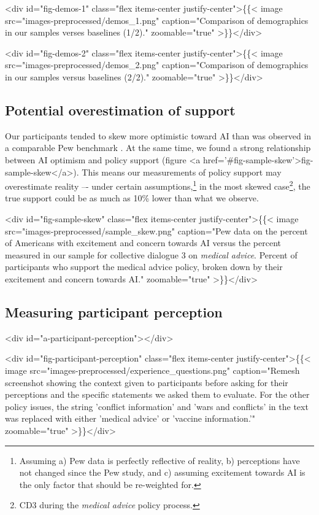 \documentclass{article}
\begin{document}
<div id="fig-demos-1" class="flex items-center justify-center">\{\{< image src="images-preprocessed/demos_1.png" caption="Comparison of demographics in our samples verses baselines (1/2)." zoomable="true" >\}\}</div>



<div id="fig-demos-2" class="flex items-center justify-center">\{\{< image src="images-preprocessed/demos_2.png" caption="Comparison of demographics in our samples versus baselines (2/2)." zoomable="true" >\}\}</div>



\subsection{Potential overestimation of support}
Our participants tended to skew more optimistic toward AI than was observed in a comparable Pew benchmark \cite{growing2023tyson}. At the same time, we found a strong relationship between AI optimism and policy support (figure <a href='#fig-sample-skew'>fig-sample-skew</a>). This means our measurements of policy support may overestimate reality –- under certain assumptions,\footnote{Assuming a) Pew data is perfectly reflective of reality, b) perceptions have not changed since the Pew study, and c) assuming excitement towards AI is the only factor that should be re-weighted for.} in the most skewed case\footnote{CD3 during the \emph{medical advice} policy process.}, the true support could be as much as 10\% lower than what we observe. 

<div id="fig-sample-skew" class="flex items-center justify-center">\{\{< image src="images-preprocessed/sample_skew.png" caption="Pew data on the percent of Americans with excitement and concern towards AI versus the percent measured in our sample for collective dialogue 3 on \emph{medical advice}. Percent of participants who support the medical advice policy, broken down by their excitement and concern towards AI." zoomable="true" >\}\}</div>



\subsection{Measuring participant perception}<div id="a-participant-perception"></div>


<div id="fig-participant-perception" class="flex items-center justify-center">\{\{< image src="images-preprocessed/experience_questions.png" caption="Remesh screenshot showing the context given to participants before asking for their perceptions and the specific statements we asked them to evaluate. For the other policy issues, the string 'conflict information' and 'wars and conflicts' in the text was replaced with either 'medical advice' or 'vaccine information.'" zoomable="true" >\}\}</div>
\end{document}
